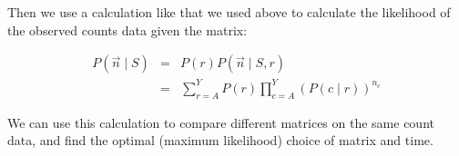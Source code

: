 Then we use a calculation like that we used above to calculate the
likelihood of the observed counts data given the matrix:

\begin {eqnarray}
P(\vec{n} \mid S) & = & P(r) P(\vec{n} \mid S,r) \\
                  & = & \sum_{r=A}^{Y}  P(r) \prod_{c = A}^{Y} (P(c \mid r))^{n_{c}} 
\end {eqnarray}

We can use this calculation to compare different matrices on the same
count data, and find the optimal (maximum likelihood) choice of matrix
and time.




